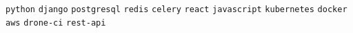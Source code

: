 \begin{entrylist}
{        %
        \texttt{python}\slashsep
        \texttt{django}\slashsep
        \texttt{postgresql}\slashsep
        \texttt{redis}\slashsep
        \texttt{celery}\slashsep
        \texttt{react}\slashsep
        \texttt{javascript}\slashsep
        \texttt{kubernetes}\slashsep
        \texttt{docker}\slashsep
        \texttt{aws}\slashsep
        \texttt{drone-ci}\slashsep
        \texttt{rest-api}\slashsep
    }
\end{entrylist}

\newpage

